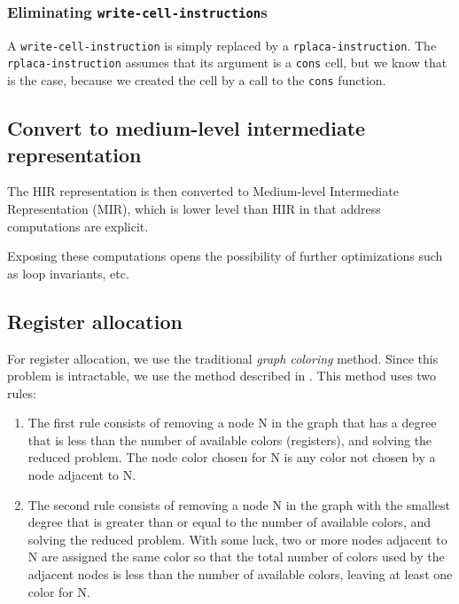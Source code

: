 \subsubsection{Eliminating \texttt{write-cell-instruction}s}

A \texttt{write-cell-instruction} is simply replaced by a
\texttt{rplaca-instruction}.  The \texttt{rplaca-instruction} assumes
that its argument is a \texttt{cons} cell, but we know that is the
case, because we created the cell by a call to the \texttt{cons}
function.

\subsection{Convert to medium-level intermediate representation}

The HIR representation is then converted to Medium-level Intermediate
Representation (MIR), which is lower level than HIR in that address
computations are explicit.

Exposing these computations opens the possibility of further
optimizations such as loop invariants, etc.

\subsection{Register allocation}

For register allocation, we use the traditional \emph{graph coloring}
method.  Since this problem is intractable, we use the method
described in \cite{Muchnick:1998:ACD:286076}.  This method uses two
rules:

\begin{enumerate}
\item The first rule consists of removing a node N in the graph that
  has a degree that is less than the number of available colors
  (registers), and solving the reduced problem.  The node color chosen
  for N is any color not chosen by a node adjacent to N.
\item The second rule consists of removing a node N in the graph with
  the smallest degree that is greater than or equal to the number of
  available colors, and solving the reduced problem.  With some luck,
  two or more nodes adjacent to N are assigned the same color so that
  the total number of colors used by the adjacent nodes is less than
  the number of available colors, leaving at least one color for N.
\end{enumerate}


